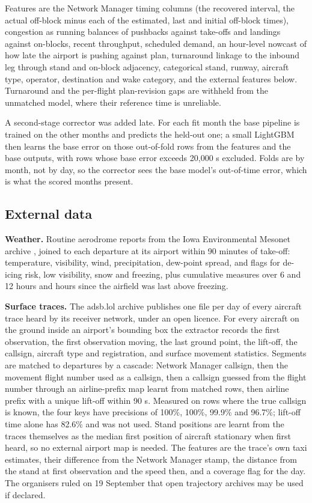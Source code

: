 \documentclass[
  manuscript=article,
  layout=preprint,
  year=2027,
  volume=x,
]{extra/joas}
\begin{document}
Features are the Network Manager timing columns (the recovered interval, the actual off-block minus each of the estimated, last and initial off-block times), congestion as running balances of pushbacks against take-offs and landings against on-blocks, recent throughput, scheduled demand, an hour-level nowcast of how late the airport is pushing against plan, turnaround linkage to the inbound leg through stand and on-block adjacency, categorical stand, runway, aircraft type, operator, destination and wake category, and the external features below. Turnaround and the per-flight plan-revision gaps are withheld from the unmatched model, where their reference time is unreliable.

A second-stage corrector \cite{wolpert1992stacked} was added late. For each fit month the base pipeline is trained on the other months and predicts the held-out one; a small LightGBM then learns the base error on those out-of-fold rows from the features and the base outputs, with rows whose base error exceeds 20,000 s excluded. Folds are by month, not by day, so the corrector sees the base model's out-of-time error, which is what the scored months present.

\subsection{External data}

\textbf{Weather.} Routine aerodrome reports from the Iowa Environmental Mesonet archive \cite{iem2026}, joined to each departure at its airport within 90 minutes of take-off: temperature, visibility, wind, precipitation, dew-point spread, and flags for de-icing risk, low visibility, snow and freezing, plus cumulative measures over 6 and 12 hours and hours since the airfield was last above freezing.

\textbf{Surface traces.} The adsb.lol archive \cite{adsblol2026} publishes one file per day of every aircraft trace heard by its receiver network, under an open licence. For every aircraft on the ground inside an airport's bounding box the extractor records the first observation, the first observation moving, the last ground point, the lift-off, the callsign, aircraft type and registration, and surface movement statistics. Segments are matched to departures by a cascade: Network Manager callsign, then the movement flight number used as a callsign, then a callsign guessed from the flight number through an airline-prefix map learnt from matched rows, then airline prefix with a unique lift-off within 90 s. Measured on rows where the true callsign is known, the four keys have precisions of 100\%, 100\%, 99.9\% and 96.7\%; lift-off time alone has 82.6\% and was not used. Stand positions are learnt from the traces themselves as the median first position of aircraft stationary when first heard, so no external airport map is needed. The features are the trace's own taxi estimates, their difference from the Network Manager stamp, the distance from the stand at first observation and the speed then, and a coverage flag for the day. The organisers ruled on 19 September that open trajectory archives may be used if declared.
\end{document}
